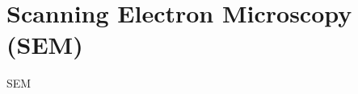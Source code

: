 \documentclass[\main/dresen_thesis.tex]{subfiles}
\begin{document}
  \section{Scanning Electron Microscopy (SEM)}
    \label{ch:methods:sem}
    SEM
\end{document}
